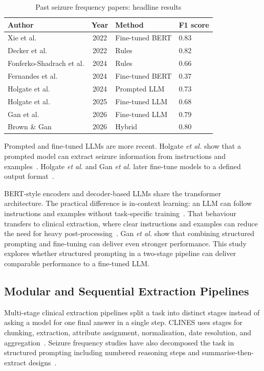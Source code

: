 \documentclass[conference]{IEEEtran}
\begin{document}
\begin{table}[!t]
\caption{Past seizure frequency papers: headline results}
\label{tab:historical}
\centering
\begin{tabularx}{\linewidth}{Ycll}
\toprule
\textbf{Author} & \textbf{Year} & \textbf{Method} & \textbf{F1 score} \\
\midrule
Xie et al. & 2022 & Fine-tuned BERT & 0.83 \\
Decker et al. & 2022 & Rules & 0.82 \\
Fonferko-Shadrach et al. & 2024 & Rules & 0.66 \\
Fernandes et al. & 2024 & Fine-tuned BERT & 0.37 \\
Holgate et al. & 2024 & Prompted LLM & 0.73 \\
Holgate et al. & 2025 & Fine-tuned LLM & 0.68 \\
Gan et al. & 2026 & Fine-tuned LLM & 0.79 \\
\midrule
Brown \& Gan & 2026 & Hybrid & 0.80 \\
\bottomrule
\end{tabularx}
\end{table}

Prompted and fine-tuned LLMs are more recent. 
Holgate \emph{et al.} show that a prompted model can 
extract seizure information from instructions and 
examples~\cite{b7}. Holgate \emph{et al.} 
and Gan \emph{et al.} later fine-tune models to a defined 
output format~\cite{b8,b5}. 

BERT-style encoders and decoder-based LLMs 
share the transformer architecture. The practical 
difference is in-context learning: an LLM can 
follow instructions and examples without 
task-specific training~\cite{b11}. That behaviour 
transfers to clinical extraction, where clear 
instructions and examples can reduce the need for 
heavy post-processing~\cite{b12}. Gan \emph{et al.}
show that combining structured prompting and 
fine-tuning can deliver even stronger performance. 
This study explores whether structured
prompting in a two-stage pipeline can deliver 
comparable performance to a fine-tuned LLM.

\subsection{Modular and Sequential Extraction Pipelines}

Multi-stage clinical extraction pipelines split a task 
into distinct stages instead of asking a model for 
one final answer in a single step. CLINES uses 
stages for chunking, extraction, attribute assignment, 
normalisation, date resolution, and aggregation~\cite{b14}. 
Seizure frequency studies have also decomposed 
the task in structured prompting including numbered 
reasoning steps and summarise-then-extract 
designs~\cite{b7,b15}. 
\end{document}
